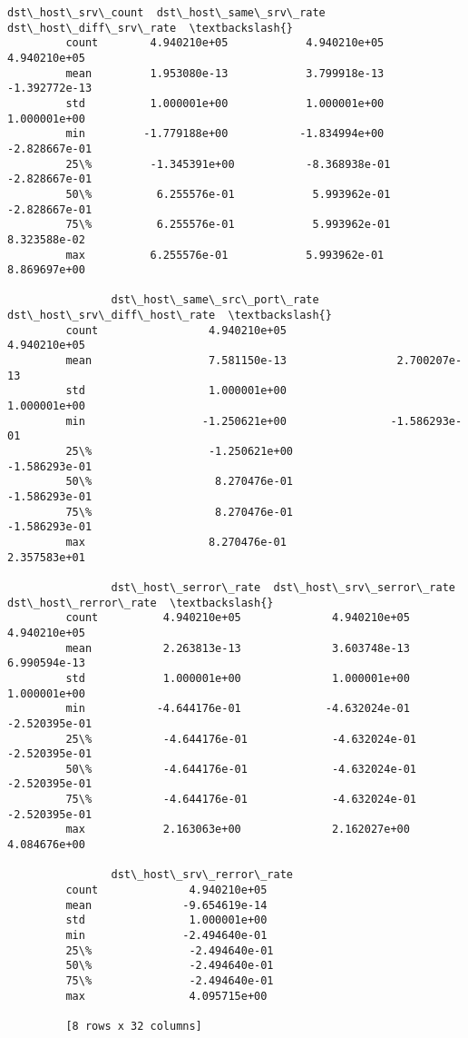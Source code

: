 \documentclass[11pt]{article}
\begin{document}
\begin{Verbatim}[commandchars=\\\{\}]
                dst\_host\_srv\_count  dst\_host\_same\_srv\_rate  dst\_host\_diff\_srv\_rate  \textbackslash{}
         count        4.940210e+05            4.940210e+05            4.940210e+05   
         mean         1.953080e-13            3.799918e-13           -1.392772e-13   
         std          1.000001e+00            1.000001e+00            1.000001e+00   
         min         -1.779188e+00           -1.834994e+00           -2.828667e-01   
         25\%         -1.345391e+00           -8.368938e-01           -2.828667e-01   
         50\%          6.255576e-01            5.993962e-01           -2.828667e-01   
         75\%          6.255576e-01            5.993962e-01            8.323588e-02   
         max          6.255576e-01            5.993962e-01            8.869697e+00   
         
                dst\_host\_same\_src\_port\_rate  dst\_host\_srv\_diff\_host\_rate  \textbackslash{}
         count                 4.940210e+05                 4.940210e+05   
         mean                  7.581150e-13                 2.700207e-13   
         std                   1.000001e+00                 1.000001e+00   
         min                  -1.250621e+00                -1.586293e-01   
         25\%                  -1.250621e+00                -1.586293e-01   
         50\%                   8.270476e-01                -1.586293e-01   
         75\%                   8.270476e-01                -1.586293e-01   
         max                   8.270476e-01                 2.357583e+01   
         
                dst\_host\_serror\_rate  dst\_host\_srv\_serror\_rate  dst\_host\_rerror\_rate  \textbackslash{}
         count          4.940210e+05              4.940210e+05          4.940210e+05   
         mean           2.263813e-13              3.603748e-13          6.990594e-13   
         std            1.000001e+00              1.000001e+00          1.000001e+00   
         min           -4.644176e-01             -4.632024e-01         -2.520395e-01   
         25\%           -4.644176e-01             -4.632024e-01         -2.520395e-01   
         50\%           -4.644176e-01             -4.632024e-01         -2.520395e-01   
         75\%           -4.644176e-01             -4.632024e-01         -2.520395e-01   
         max            2.163063e+00              2.162027e+00          4.084676e+00   
         
                dst\_host\_srv\_rerror\_rate  
         count              4.940210e+05  
         mean              -9.654619e-14  
         std                1.000001e+00  
         min               -2.494640e-01  
         25\%               -2.494640e-01  
         50\%               -2.494640e-01  
         75\%               -2.494640e-01  
         max                4.095715e+00  
         
         [8 rows x 32 columns]
\end{Verbatim}
            
\end{document}
